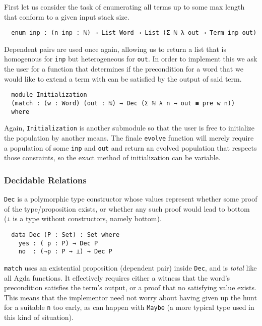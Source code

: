 \documentclass[runningheads,a4paper]{llncs}
\begin{document}
First let us consider the task of enumerating all terms up to some max
length that conform to a given input stack size.

\begin{verbatim}
  enum-inp : (n inp : ℕ) → List Word → List (Σ ℕ λ out → Term inp out)
\end{verbatim}

Dependent pairs are used once again, allowing us to return a list
that is homogenous for \texttt{inp} but heterogeneous for
\texttt{out}. In order to implement this we ask the user for a
function that determines if the precondition for a word that we would
like to extend a term with can be satisfied by the output of said
term.

\begin{verbatim}
  module Initialization
  (match : (w : Word) (out : ℕ) → Dec (Σ ℕ λ n → out ≡ pre w n))
  where
\end{verbatim}

Again, \texttt{Initialization} is another submodule so that the user
is free to initialize the population by another means. The finale
\texttt{evolve} function will merely require a population of some
\texttt{inp} and \texttt{out} and return an evolved population that
respects those consraints, so the exact method of initialization can
be variable.

\subsubsection{Decidable Relations}

\texttt{Dec} is a polymorphic type constructor whose values
represent whether some proof of the type/proposition exists, or
whether any such proof would lead to bottom (\texttt{⊥} is a type
without constructors, namely bottom).

\begin{verbatim}
  data Dec (P : Set) : Set where
    yes : ( p : P) → Dec P
    no  : (¬p : P → ⊥) → Dec P
\end{verbatim}

\texttt{match} uses an existential proposition (dependent
pair) inside \texttt{Dec}, and is \textit{total} like all Agda functions.
It effectively requires either a witness that the word's precondition
satisfies the term's output, or a proof that no satisfying value
exists. This means that the implementor need not worry about having
given up the hunt for a suitable \texttt{n} too early, as can happen
with \texttt{Maybe} (a more typical type used in this kind of situation).
\end{document}
